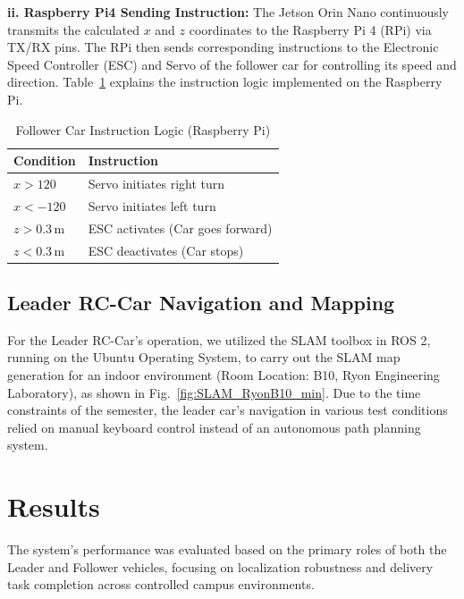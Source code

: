 \documentclass[journal,transmag]{IEEEtran}
\begin{document}
\textbf{ii. Raspberry Pi4 Sending Instruction:} The Jetson Orin Nano continuously transmits the calculated $x$ and $z$ coordinates to the Raspberry Pi 4 (RPi) via TX/RX pins. The RPi then sends corresponding instructions to the Electronic Speed Controller (ESC) and Servo of the follower car for controlling its speed and direction. Table~\ref{tab:The Instruction Logic of Raspberry Pi} explains the instruction logic implemented on the Raspberry Pi.

\begin{table}[h]
\centering
\caption{Follower Car Instruction Logic (Raspberry Pi)}
\label{tab:The Instruction Logic of Raspberry Pi}
\begin{tabularx}{\columnwidth}{l X}
\hline
\textbf{Condition} & \textbf{Instruction} \\
\hline
$x > 120$ & Servo initiates right turn \\
$x < -120$ & Servo initiates left turn \\
$z > 0.3\,\text{m}$ & ESC activates (Car goes forward) \\
$z < 0.3\,\text{m}$ & ESC deactivates (Car stops) \\
\hline
\end{tabularx}
\end{table}

\subsection{Leader RC-Car Navigation and Mapping}

For the Leader RC-Car's operation, we utilized the SLAM toolbox in ROS 2, running on the Ubuntu Operating System, to carry out the SLAM map generation for an indoor environment (Room Location: B10, Ryon Engineering Laboratory), as shown in Fig.~\ref{fig:SLAM_RyonB10_min}. Due to the time constraints of the semester, the leader car's navigation in various test conditions relied on manual keyboard control instead of an autonomous path planning system.

\section{Results}
The system's performance was evaluated based on the primary roles of both the Leader and Follower vehicles, focusing on localization robustness and delivery task completion across controlled campus environments.
\end{document}
